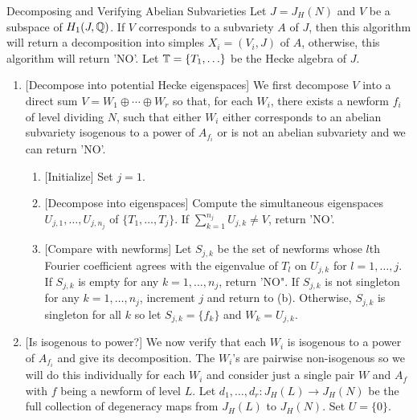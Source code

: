 \documentclass{article}
\begin{document}
\begin{algorithm}{Decomposing and Verifying Abelian Subvarieties}
    Let $J=J_H(N)$ and $V$ be a subspace of $H_1(J, \mathbb{Q})$. If $V$ corresponds
    to a subvariety $A$ of $J$, then this algorithm will return a decomposition
    into simples $X_i=(V_i, J)$ of $A$, otherwise, this algorithm will return
    'NO'. Let $\mathbb{T}=\{T_1,\ldots\}$ be the Hecke algebra of $J$.
    \begin{enumerate}
        \item{} [Decompose into potential Hecke eigenspaces] 
            We first decompose $V$ into a direct sum $V=W_1\oplus \cdots \oplus
            W_r$ so that, for each $W_i$, there exists a newform $f_i$ of level
            dividing $N$, such that either $W_i$ either corresponds to an
            abelian subvariety isogenous to a power of $A_{f_i}$ or is not an
            abelian subvariety and we can return 'NO'.
            \begin{enumerate}
                \item{} [Initialize]
                    Set $j=1$.
                \item{} [Decompose into eigenspaces]
                    Compute the simultaneous eigenspaces $U_{j,1},\ldots,U_{j,
                    n_j}$ of $\{T_1,\ldots,T_j\}$. If $\sum_{k=1} ^{n_j}
                    U_{j, k}\neq V$, return 'NO'.
                \item{} [Compare with newforms]
                    Let $S_{j,k}$ be the set of newforms whose $l$th Fourier
                    coefficient agrees with the eigenvalue of $T_l$ on $U_{j,
                    k}$ for $l=1,\ldots,j$. If $S_{j, k}$ is empty for any
                    $k=1,\ldots,n_j$, return 'NO". If $S_{j,k}$ is not
                    singleton for any $k=1,\ldots, n_j$, increment $j$ and
                    return to (b). Otherwise, $S_{j,k}$ is singleton for all
                    $k$ so let $S_{j,k}=\{f_k\}$ and $W_k=U_{j,k}$.
            \end{enumerate}
        \item{} [Is isogenous to power?]
            We now verify that each $W_i$ is isogenous to a power of $A_{f_i}$
            and give its decomposition. The $W_i$'s are pairwise non-isogenous
            so we will do this individually for each $W_i$ and consider just a
            single pair $W$ and $A_f$ with $f$ being a newform of level $L$.
            Let $d_1,\ldots,d_r:J_H(L)\to J_H(N)$ be the full collection of
            degeneracy maps from $J_H(L)$ to $J_H(N)$.  Set $U=\{0\}$.

\end{enumerate}
\end{algorithm}
\end{document}

